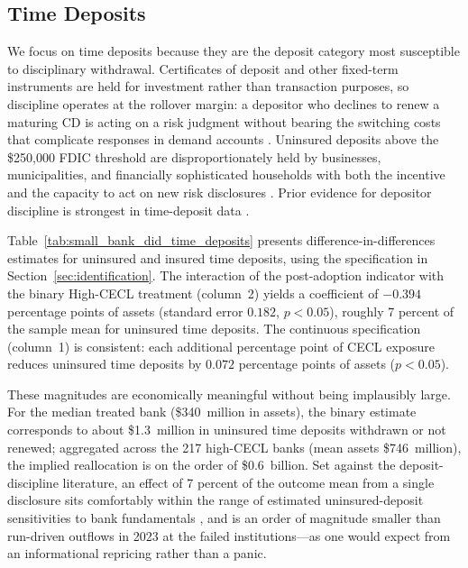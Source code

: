 \subsection{Time Deposits}
\label{sec:results:time_deposits}

We focus on time deposits because they are the deposit category most susceptible
to disciplinary withdrawal.  Certificates of deposit and other fixed-term
instruments are held for investment rather than transaction purposes, so discipline
operates at the rollover margin: a depositor who declines to renew a maturing CD
is acting on a risk judgment without bearing the switching costs that complicate
responses in demand accounts \citep{calomiris1991role, iyer2016tale}.  Uninsured
deposits above the \$250{,}000 FDIC threshold are disproportionately held by
businesses, municipalities, and financially sophisticated households with both
the incentive and the capacity to act on new risk disclosures \citep{flannery1998using,
gee2022decision}.  Prior evidence for depositor discipline is strongest in
time-deposit data \citep{maechler2006dynamic, egan2017deposit}.

Table~\ref{tab:small_bank_did_time_deposits} presents difference-in-differences
estimates for uninsured and insured time deposits, using the specification in
Section~\ref{sec:identification}.  The interaction of the post-adoption indicator
with the binary High-CECL treatment (column~2) yields a coefficient of $-0.394$
percentage points of assets (standard error $0.182$, $p < 0.05$), roughly 7
percent of the sample mean for uninsured time deposits.  The continuous
specification (column~1) is consistent: each additional percentage point of CECL
exposure reduces uninsured time deposits by $0.072$ percentage points of assets
($p < 0.05$).

These magnitudes are economically meaningful without being implausibly large.
For the median treated bank (\$340~million in assets), the binary estimate
corresponds to about \$1.3~million in uninsured time deposits withdrawn or not
renewed; aggregated across the 217 high-CECL banks (mean assets
\$746~million), the implied reallocation is on the order of \$0.6~billion.
Set against the deposit-discipline literature, an effect of 7 percent of the
outcome mean from a single disclosure sits comfortably within the range of
estimated uninsured-deposit sensitivities to bank fundamentals
\citep{martinez2001depositors, egan2017deposit}, and is an order of magnitude
smaller than run-driven outflows in 2023 at the failed institutions---as one
would expect from an informational repricing rather than a panic.

